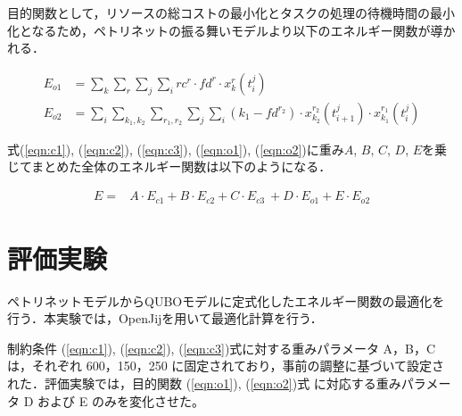 目的関数として，リソースの総コストの最小化とタスクの処理の待機時間の最小化となるため，ペトリネットの振る舞いモデルより以下のエネルギー関数が導かれる．

\begin{align} 
E_{o1} &= \sum_k \sum_r \sum_j \sum_i rc^r \cdot fd^r \cdot x_{k}^{r}(t_{i}^{j}) \label{eqn:o1}\\
E_{o2} &= \sum_i \sum_{k_1,k_2} \sum_{r_1,r_2} \sum_j \sum_i \left( k_1 - fd^{r_2} \right) \cdot x_{k_2}^{r_2}(t_{i+1}^{j}) \cdot x_{k_1}^{r_1}(t_{i}^{j}) \label{eqn:o2} 
\end{align}

式(\ref{eqn:c1}), (\ref{eqn:c2}), (\ref{eqn:c3}), (\ref{eqn:o1}), (\ref{eqn:o2})に重み$A$, $B$, $C$, $D$, $E$を乗じてまとめた全体のエネルギー関数は以下のようになる．

\begin{align} 
E = &A \cdot E_{c1} + B \cdot E_{c2} + C \cdot E_{c3} \ + D \cdot E_{o1} + E \cdot E_{o2} 
\end{align}

\section{評価実験}
ペトリネットモデルからQUBOモデルに定式化したエネルギー関数の最適化を行う．本実験では，OpenJijを用いて最適化計算を行う．

制約条件 (\ref{eqn:c1}), (\ref{eqn:c2}), (\ref{eqn:c3})式に対する重みパラメータ A，B，C は，それぞれ 600，150，250 に固定されており，事前の調整に基づいて設定された．評価実験では，目的関数 (\ref{eqn:o1}), (\ref{eqn:o2})式 に対応する重みパラメータ D および E のみを変化させた。
